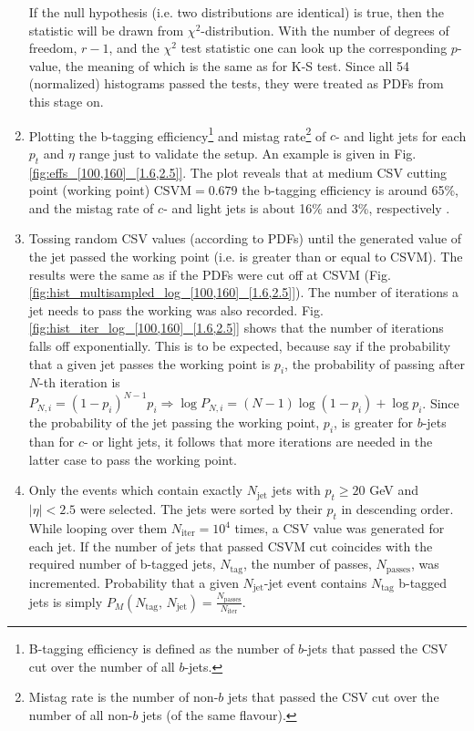 \documentclass[12pt,a4paper]{article}
\begin{document}
\begin{enumerate}
If the null hypothesis (i.e. two distributions are identical) is true, then the statistic will be drawn from $\chi^2$-distribution.
With the number of degrees of freedom, $r - 1$, and the $\chi^2$ test statistic one can look up the corresponding $p$-value, the meaning of which is the same as for K-S test.
Since all 54 (normalized) histograms passed the tests, they were treated as PDFs from this stage on.
\item Plotting the b-tagging efficiency\footnote{B-tagging efficiency is defined as the number of $b$-jets that passed the CSV cut over the number of all $b$-jets.} and mistag rate\footnote{Mistag rate is the number of non-$b$ jets that passed the CSV cut over the number of all non-$b$ jets (of the same flavour).} of $c$- and light jets for each $p_t$ and $\eta$ range just to validate the setup.
An example is given in Fig. \ref{fig:effs_[100,160]_[1.6,2.5]}.
The plot reveals that at medium CSV cutting point (working point) $\mbox{CSVM}=0.679$ the b-tagging efficiency is around 65\%, and the mistag rate of $c$- and light jets is about 16\% and 3\%, respectively \cite{CSVM}.
\item Tossing random CSV values (according to PDFs) until the generated value of the jet passed the working point (i.e. is greater than or equal to CSVM).
The results were the same as if the PDFs were cut off at CSVM (Fig. \ref{fig:hist_multisampled_log_[100,160]_[1.6,2.5]}).
The number of iterations a jet needs to pass the working was also recorded.
Fig. \ref{fig:hist_iter_log_[100,160]_[1.6,2.5]} shows that the number of iterations falls off exponentially.
This is to be expected, because say if the probability that a given jet passes the working point is $p_i$, the probability of passing after $N$-th iteration is $P_{N,i} = (1-p_i)^{N-1}p_i \Rightarrow \log P_{N,i} = (N-1)\log(1 - p_i) + \log p_i$.
Since the probability of the jet passing the working point, $p_i$, is greater for $b$-jets than for $c$- or light jets, it follows that more iterations are needed in the latter case to pass the working point.
\item Only the events which contain exactly $N_{\text{jet}}$ jets with $p_t \geq 20$ GeV and $|\eta| < 2.5$ were selected.
The jets were sorted by their $p_t$ in descending order.
While looping over them $N_{\text{iter}} = 10^4$ times, a CSV value was generated for each jet.
If the number of jets that passed CSVM cut coincides with the required number of b-tagged jets, $N_{\text{tag}}$, the number of passes, $N_{\text{passes}}$, was incremented.
Probability that a given $N_{\text{jet}}$-jet event contains $N_{\text{tag}}$ b-tagged jets is simply $P_M\left(N_{\text{tag}},\,N_{\text{jet}}\right)=\frac{N_{\text{passes}}}{N_{\text{iter}}}$.

\end{enumerate}
\end{document}
